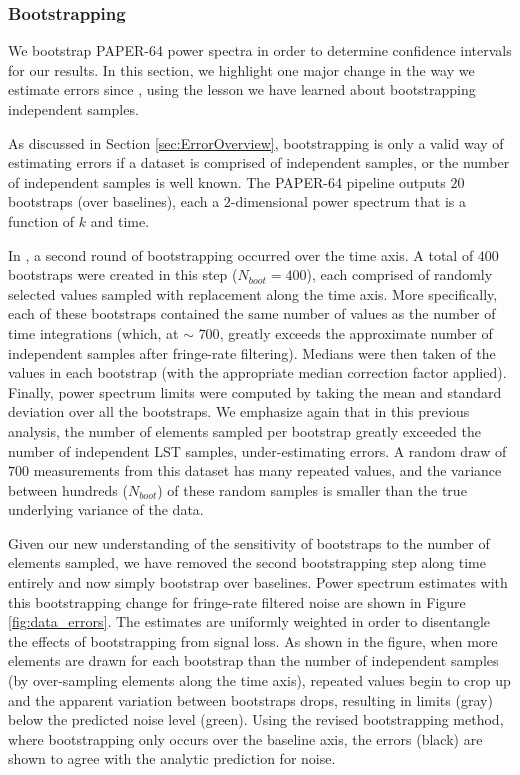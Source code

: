 \documentclass[preprint2,numberedappendix,tighten]{aastex6}  %
\begin{document}
\subsubsection{Bootstrapping}
\label{sec:Boot}

We bootstrap PAPER-64 power spectra in order to determine confidence intervals for our results. In this section, we highlight 
one major change in the way we estimate errors since , using the lesson we have learned about bootstrapping independent samples.

As discussed in Section \ref{sec:ErrorOverview}, bootstrapping is only a valid way of estimating errors if a dataset is comprised 
of independent samples, or the number of independent samples is well known. The PAPER-64 pipeline outputs $20$ bootstraps (over baselines), each a $2$-dimensional power 
spectrum that is a function of $k$ and time. 

In , a second round of bootstrapping occurred over the time axis. A total of $400$ bootstraps were created in this step 
($N_{boot} = 400$), each comprised of randomly selected values sampled with replacement along the time axis. More 
specifically, each of these bootstraps contained the same number of values as the number of time integrations (which, at $\sim$
$700$, greatly exceeds the approximate number of independent samples after fringe-rate filtering).
Medians were then taken of the values in each bootstrap (with the appropriate median correction factor applied). Finally, power 
spectrum limits were computed by taking the mean and standard deviation over all the bootstraps. We emphasize again that in 
this previous analysis, the number of elements sampled per bootstrap greatly 
exceeded the number of independent LST samples, under-estimating errors. A random draw of $700$ 
measurements from this dataset has many repeated values, and the variance between hundreds ($N_{boot}$) of these random 
samples is smaller than the true underlying variance of the data. 

Given our new understanding of the sensitivity of bootstraps to the number of elements sampled, we have removed the second 
bootstrapping step along time entirely and now simply bootstrap over baselines. Power spectrum estimates with this bootstrapping change for fringe-rate filtered noise are shown in Figure 
\ref{fig:data_errors}. The estimates are uniformly weighted in order to disentangle the effects of bootstrapping from signal loss. As 
shown in the figure, when more elements are drawn for each bootstrap than the number of 
independent samples (by over-sampling elements along the time axis), repeated values begin to crop up and the apparent variation between bootstraps drops, resulting in limits (gray) below the predicted noise level (green). Using the revised bootstrapping method, where bootstrapping only occurs over the baseline axis, the errors (black) are shown to agree with the analytic prediction for noise.
\end{document}
